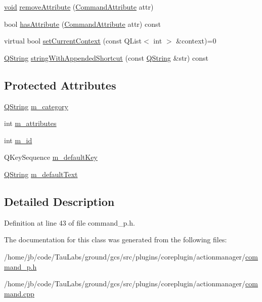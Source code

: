\begin{DoxyCompactItemize}
\hyperlink{group___u_a_v_objects_plugin_ga444cf2ff3f0ecbe028adce838d373f5c}{void} \hyperlink{group___core_plugin_gaf93160aaab64518efe208d5b7e674f05}{remove\-Attribute} (\hyperlink{group___core_plugin_ga4d899c1f711159a432afeab3eb78c917}{\-Command\-Attribute} attr)
\item 
bool \hyperlink{group___core_plugin_ga3a7cc9955526f08640f232578c1dff74}{has\-Attribute} (\hyperlink{group___core_plugin_ga4d899c1f711159a432afeab3eb78c917}{\-Command\-Attribute} attr) const 
\item 
virtual bool \hyperlink{group___core_plugin_ga7e93a5c0eeb452e6521b2226f8f6c0b1}{set\-Current\-Context} (const \-Q\-List$<$ int $>$ \&context)=0
\item 
\hyperlink{group___u_a_v_objects_plugin_gab9d252f49c333c94a72f97ce3105a32d}{\-Q\-String} \hyperlink{group___core_plugin_gae13875281dec49fa636de5062ee529df}{string\-With\-Appended\-Shortcut} (const \hyperlink{group___u_a_v_objects_plugin_gab9d252f49c333c94a72f97ce3105a32d}{\-Q\-String} \&str) const 
\end{DoxyCompactItemize}
\subsection*{\-Protected \-Attributes}
\begin{DoxyCompactItemize}
\item 
\hyperlink{group___u_a_v_objects_plugin_gab9d252f49c333c94a72f97ce3105a32d}{\-Q\-String} \hyperlink{group___core_plugin_gaaf7dc3b2670761aed9b0fcd72e26e3de}{m\-\_\-category}
\item 
int \hyperlink{group___core_plugin_gab044af6a24be070e1768de73d42fc061}{m\-\_\-attributes}
\item 
int \hyperlink{group___core_plugin_ga73ea1412ce25f01d64a6abae17e5231d}{m\-\_\-id}
\item 
\-Q\-Key\-Sequence \hyperlink{group___core_plugin_ga052270796043a63f83fe558ce4ad9527}{m\-\_\-default\-Key}
\item 
\hyperlink{group___u_a_v_objects_plugin_gab9d252f49c333c94a72f97ce3105a32d}{\-Q\-String} \hyperlink{group___core_plugin_ga6cab8c588b096399add5878601b7c485}{m\-\_\-default\-Text}
\end{DoxyCompactItemize}


\subsection{\-Detailed \-Description}


\-Definition at line 43 of file command\-\_\-p.\-h.



\-The documentation for this class was generated from the following files\-:\begin{DoxyCompactItemize}
\item 
/home/jb/code/\-Tau\-Labs/ground/gcs/src/plugins/coreplugin/actionmanager/\hyperlink{command__p_8h}{command\-\_\-p.\-h}\item 
/home/jb/code/\-Tau\-Labs/ground/gcs/src/plugins/coreplugin/actionmanager/\hyperlink{command_8cpp}{command.\-cpp}\end{DoxyCompactItemize}
